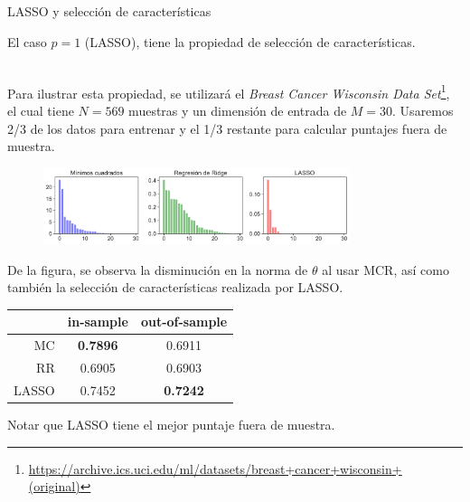 \documentclass[handout, 9pt]{beamer}
\begin{document}
\begin{frame}{LASSO y selección de características}

El caso $p=1$ (LASSO), tiene la propiedad de selección de características.\\~\ \pause

Para ilustrar esta propiedad, se utilizará el \emph{Breast Cancer Wisconsin Data Set}\footnote{\url{https://archive.ics.uci.edu/ml/datasets/breast+cancer+wisconsin+(original)}}, el cual tiene $N=569$ muestras y un dimensión de entrada de $M=30$. Usaremos  2/3 de los datos para entrenar y el 1/3 restante para calcular puntajes fuera de muestra. \\

\begin{figure}[H]
	\centering
	\includegraphics[width=0.8\textwidth]{../../img/cap2_OLS_RR_LASSO.pdf}
\end{figure} \pause

De la figura, se observa la disminución en la norma de $\theta$ al usar MCR, así como también la selección de características realizada por LASSO.\pause

\begin{table}[h]
\centering
\footnotesize
	\begin{tabular}{ r|c|c } 
		 & in-sample & out-of-sample \\
		\hline
		MC & \textbf{0.7896} & 0.6911 \\ 
		RR & 0.6905 & 0.6903 \\ 
		LASSO & 0.7452 & \textbf{0.7242}
	\end{tabular}
\end{table}

 Notar que LASSO tiene el mejor puntaje fuera de muestra.

\end{frame}
\end{document}
